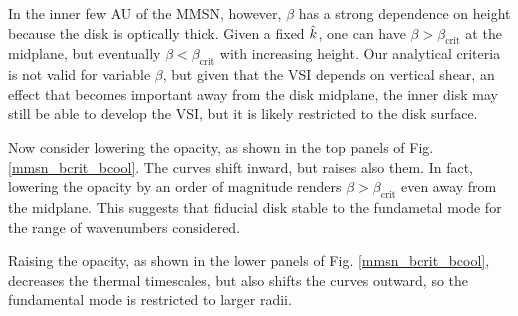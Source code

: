 In the inner few AU of the MMSN, however, $\beta$  has a
strong dependence on height because the disk is optically thick. Given
a fixed $\hat{k}$, one can have $\beta > \beta_\mathrm{crit}$ at the
midplane, but eventually $\beta<\beta_\mathrm{crit}$ with increasing
height. Our analytical criteria is not valid for variable $\beta$, but
given that the VSI depends on vertical shear, an effect that becomes
important away from the disk midplane, the inner disk may still be
able to develop the VSI, but it is likely restricted to the disk
surface.   

Now consider lowering the opacity, as shown in the top panels of
Fig. \ref{mmsn_bcrit_bcool}. The curves shift inward, but raises also
them. In fact, lowering the opacity by an order of magnitude renders
$\beta > \beta_\mathrm{crit}$ even away from the midplane. This
suggests that fiducial  disk stable to the fundametal mode for the
range of wavenumbers considered.  

Raising the opacity, as shown in the lower panels of
Fig. \ref{mmsn_bcrit_bcool}, decreases the thermal timescales, but
also shifts the curves outward, so the fundamental mode is restricted
to larger radii.  


